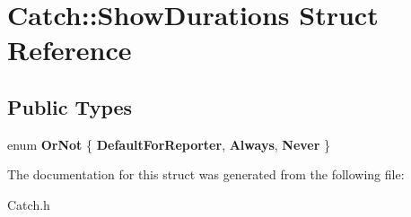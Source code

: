 \hypertarget{struct_catch_1_1_show_durations}{\section{Catch\-:\-:Show\-Durations Struct Reference}
\label{struct_catch_1_1_show_durations}
}
\subsection*{Public Types}
\begin{DoxyCompactItemize}
\item 
enum {\bfseries Or\-Not} \{ {\bfseries Default\-For\-Reporter}, 
{\bfseries Always}, 
{\bfseries Never}
 \}
\end{DoxyCompactItemize}


The documentation for this struct was generated from the following file\-:\begin{DoxyCompactItemize}
\item 
Catch.\-h\end{DoxyCompactItemize}
